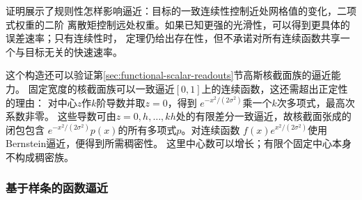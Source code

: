 证明展示了规则性怎样影响逼近：目标的一致连续性控制近处网格值的变化，二项式权重的二阶
离散矩控制远处权重。如果已知更强的光滑性，可以得到更具体的误差速率；只有连续性时，
定理仍给出存在性，但不承诺对所有连续函数共享一个与目标无关的快速速率。

这个构造还可以验证第\ref{sec:functional-scalar-readouts}节高斯核截面族的逼近能力。
固定宽度的核截面族可以一致逼近$[0,1]$上的连续函数，这还需超出正定性的理由：
对中心$z$作$k$阶导数并取$z=0$，得到
$e^{-x^2/(2\sigma^2)}$乘一个$k$次多项式，最高次系数非零。
这些导数可由$z=0,h,\ldots,kh$处的有限差分一致逼近，故核截面张成的闭包包含
$e^{-x^2/(2\sigma^2)}p(x)$的所有多项式$p$。对连续函数
$f(x)e^{x^2/(2\sigma^2)}$使用Bernstein逼近，便得到所需稠密性。
这里中心数可以增长；有限个固定中心本身不构成稠密族。
\subsubsection{基于样条的函数逼近}
\label{sec:functional-spline-approximation}

